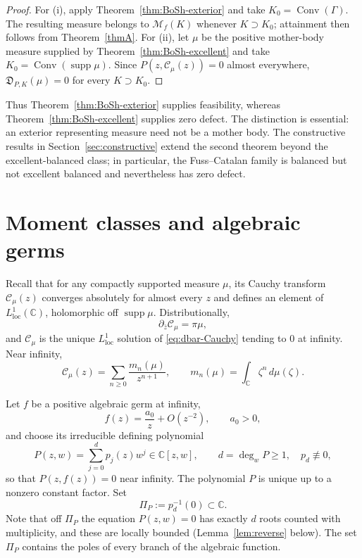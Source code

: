 \documentclass[10pt,a4paper]{amsart}
\newcommand{\bC}{\mathbb C}
\newcommand{\M}{\mathcal M}
\newcommand{\Cauchy}{\mathcal C}
\newcommand{\supp}{\operatorname{supp}}
\newcommand{\Conv}{\operatorname{Conv}}
\begin{document}
\begin{proof}
For \textup{(i)}, apply Theorem~\ref{thm:BoSh-exterior} and take
$K_0=\Conv(\Gamma)$.  The resulting measure belongs to $\M_f(K)$ whenever
$K\supset K_0$; attainment then follows from Theorem~\ref{thmA}.  For
\textup{(ii)}, let $\mu$ be the positive mother-body measure supplied by
Theorem~\ref{thm:BoSh-excellent} and take
$K_0=\Conv(\supp\mu)$.  Since
$P(z,\Cauchy_\mu(z))=0$ almost everywhere, $\mathfrak D_{P,K}(\mu)=0$ for every
$K\supset K_0$.
\end{proof}

Thus Theorem~\ref{thm:BoSh-exterior} supplies feasibility, whereas
Theorem~\ref{thm:BoSh-excellent} supplies zero defect.  The distinction is
essential: an exterior representing measure need not be a mother body.  The
constructive results in Section~\ref{sec:constructive} extend the second theorem
beyond the excellent-balanced class; in particular, the Fuss--Catalan family is
balanced but not excellent balanced and nevertheless has zero defect.

\section{Moment classes and algebraic germs}\label{sec:moment}

Recall that for any compactly supported measure $\mu$, its Cauchy transform $\Cauchy_\mu(z)$ converges absolutely for almost every $z$ and defines an element of
$L^1_{\mathrm{loc}}(\bC)$, holomorphic off $\supp\mu$.  Distributionally,
\begin{equation}\label{eq:dbar-Cauchy}
 \partial_{\bar z}\Cauchy_\mu=\pi\mu ,
\end{equation}
and $\Cauchy_\mu$ is the unique $L^1_{\mathrm{loc}}$ solution of
\eqref{eq:dbar-Cauchy} tending to $0$ at infinity.  Near infinity,
\[
 \Cauchy_\mu(z)=\sum_{n\geq 0}\frac{m_n(\mu)}{z^{n+1}},
 \qquad
 m_n(\mu)=\int_{\bC}\zeta^n\,d\mu(\zeta).
\]

Let $f$ be a positive algebraic germ at infinity,
\[
 f(z)=\frac{a_0}{z}+O(z^{-2}),\qquad a_0>0,
\]
and choose its irreducible defining polynomial
\begin{equation}\label{eq:minimal-polynomial}
 P(z,w)=\sum_{j=0}^{d}p_j(z)w^j\in\bC[z,w],
 \qquad d=\deg_wP\geq 1,\quad p_d\not\equiv0,
\end{equation}
so that $P(z,f(z))=0$ near infinity.  The polynomial $P$ is unique up to a
nonzero constant factor.  Set 
\begin{equation}\label{eq:polar-set}
 \Pi_P:=p_d^{-1}(0)\subset\bC.
\end{equation}
Note that  off $\Pi_P$ the equation $P(z,w)=0$ has exactly $d$ roots counted
with multiplicity, and these are locally bounded (Lemma~\ref{lem:reverse}
below).  The set $\Pi_P$ contains the poles of every branch of the algebraic
function.
\end{document}
